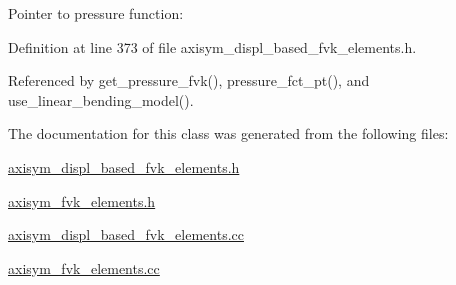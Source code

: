 Pointer to pressure function\+: 



Definition at line 373 of file axisym\+\_\+displ\+\_\+based\+\_\+fvk\+\_\+elements.\+h.



Referenced by get\+\_\+pressure\+\_\+fvk(), pressure\+\_\+fct\+\_\+pt(), and use\+\_\+linear\+\_\+bending\+\_\+model().



The documentation for this class was generated from the following files\+:\begin{DoxyCompactItemize}
\item 
\hyperlink{axisym__displ__based__fvk__elements_8h}{axisym\+\_\+displ\+\_\+based\+\_\+fvk\+\_\+elements.\+h}\item 
\hyperlink{axisym__fvk__elements_8h}{axisym\+\_\+fvk\+\_\+elements.\+h}\item 
\hyperlink{axisym__displ__based__fvk__elements_8cc}{axisym\+\_\+displ\+\_\+based\+\_\+fvk\+\_\+elements.\+cc}\item 
\hyperlink{axisym__fvk__elements_8cc}{axisym\+\_\+fvk\+\_\+elements.\+cc}\end{DoxyCompactItemize}
